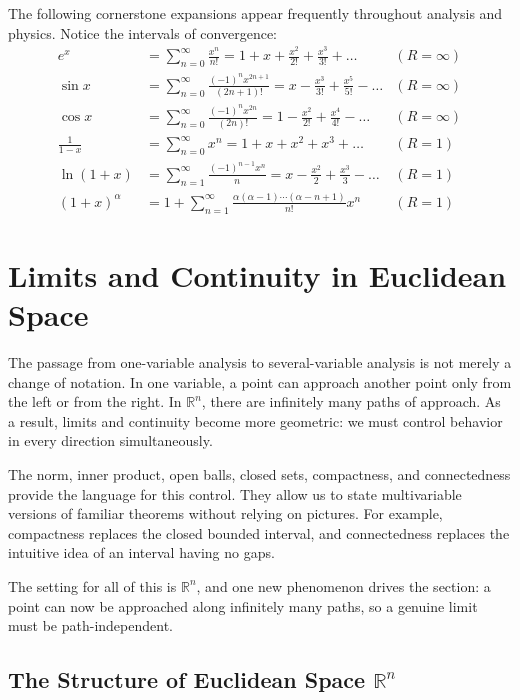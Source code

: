 \begin{example}
The following cornerstone expansions appear frequently throughout analysis and physics. Notice the intervals of convergence:
\begin{align*}
    e^x &= \sum_{n=0}^{\infty} \frac{x^n}{n!} = 1 + x + \frac{x^2}{2!} + \frac{x^3}{3!} + \dots & (R = \infty) \\
    \sin x &= \sum_{n=0}^{\infty} \frac{(-1)^n x^{2n+1}}{(2n+1)!} = x - \frac{x^3}{3!} + \frac{x^5}{5!} - \dots & (R = \infty) \\
    \cos x &= \sum_{n=0}^{\infty} \frac{(-1)^n x^{2n}}{(2n)!} = 1 - \frac{x^2}{2!} + \frac{x^4}{4!} - \dots & (R = \infty) \\
    \frac{1}{1-x} &= \sum_{n=0}^{\infty} x^n = 1 + x + x^2 + x^3 + \dots & (R = 1) \\
    \ln(1+x) &= \sum_{n=1}^{\infty} \frac{(-1)^{n-1} x^n}{n} = x - \frac{x^2}{2} + \frac{x^3}{3} - \dots & (R = 1) \\
    (1+x)^\alpha &= 1 + \sum_{n=1}^{\infty} \frac{\alpha(\alpha-1)\cdots(\alpha-n+1)}{n!} x^n & (R = 1)
\end{align*}
\end{example}

\section{Limits and Continuity in Euclidean Space}


The passage from one-variable analysis to several-variable analysis is not merely a change of notation. In one variable, a point can approach another point only from the left or from the right. In $\mathbb{R}^n$, there are infinitely many paths of approach. As a result, limits and continuity become more geometric: we must control behavior in every direction simultaneously.

The norm, inner product, open balls, closed sets, compactness, and connectedness provide the language for this control. They allow us to state multivariable versions of familiar theorems without relying on pictures. For example, compactness replaces the closed bounded interval, and connectedness replaces the intuitive idea of an interval having no gaps.

The setting for all of this is $\mathbb{R}^n$, and one new phenomenon drives the section: a point can now be approached along infinitely many paths, so a genuine limit must be path-independent.

\subsection{The Structure of Euclidean Space \texorpdfstring{$\mathbb{R}^n$}{R n}}

